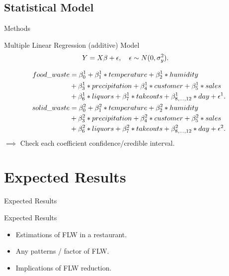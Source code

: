 \documentclass{beamer}
\begin{document}
\subsection{Statistical Model}
\begin{frame}{Methods}
    \small
    \begin{block}{Multiple Linear Regression (additive) Model}
        \[
        \begin{aligned}
            \small Y &=  X\beta + \epsilon, \hspace{1em}
            \epsilon \sim N(0, \sigma_y^2).
        \end{aligned}
        \]
    \end{block}
    \begin{align*}
        \small food\_waste 
        &= \beta_0^1 + \beta_1^1 * temperature + \beta_2^1 * humidity \\
        &+ \beta_3^1 * precipitation + \beta_4^1 * customer + \beta_5^1 * sales\\ 
        &+ \beta_6^1 * liquors + \beta_7^1 * takeouts 
        + \beta_{8,...,12}^1 * day + \epsilon^1.\\
        \small solid\_waste 
        &= \beta_0^2 + \beta_1^2 * temperature + \beta_2^2 * humidity \\
        &+ \beta_3^2 * precipitation + \beta_4^2 * customer + \beta_5^2 * sales\\ 
        &+ \beta_6^2 * liquors + \beta_7^2 * takeouts 
        + \beta_{8,...,12}^2 * day + \epsilon^2.
    \end{align*}
    \normalsize $\implies$ Check each coefficient confidence/credible interval.
\end{frame}

\section{Expected Results}
\begin{frame}{Expected Results}
    \begin{block}{Expected Results}
        \begin{itemize}
            \item Estimations of FLW in a restaurant.
            \item Any patterns / factor of FLW.
            \item Implications of FLW reduction.
        \end{itemize}
    \end{block}
\end{frame}
\end{document}
